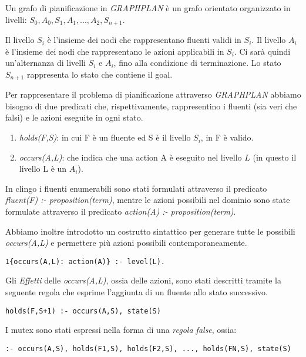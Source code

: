 Un grafo di pianificazione in \emph{GRAPHPLAN} è un grafo orientato organizzato in livelli: $S_0, A_0, S_1, A_1, ... , A_2, S_{n+1}$.

Il livello $S_i$ è l'insieme dei nodi che rappresentano fluenti validi in $S_i$. Il livello $A_i$ è l'insieme dei nodi che rappresentano le azioni applicabili in $S_i$. Ci sarà quindi un'alternanza di livelli $S_i$ e $A_i$, fino alla condizione di terminazione. Lo stato $S_{n+1}$ rappresenta lo stato che contiene il goal.

Per rappresentare il problema di pianificazione attraverso \emph{GRAPHPLAN} abbiamo bisogno di due predicati che, rispettivamente, rappresentino i fluenti (sia veri che falsi) e le azioni eseguite in ogni stato.

\begin{enumerate}
\item \emph{holds(F,S)}: in cui F è un fluente ed S è il livello $S_i$, in F è valido.
\item \emph{occurs(A,L)}: che indica che una action A è eseguito nel livello $L$ (in questo il livello L è un $A_i$).
\end{enumerate}

In clingo i fluenti enumerabili sono stati formulati attraverso il predicato \emph{fluent(F) :- proposition(term)}, mentre le azioni possibili nel dominio sono state formulate attraverso il predicato \emph{action(A) :- proposition(term)}.

Abbiamo inoltre introdotto un costrutto sintattico per generare tutte le possibili \emph{occurs(A,L)} e permettere più azioni possibili contemporaneamente.

\begin{lstlisting}
1{occurs(A,L): action(A)} :- level(L).
\end{lstlisting}

Gli \emph{Effetti} delle \emph{occurs(A,L)}, ossia delle azioni, sono stati descritti tramite la seguente regola che esprime l'aggiunta di un fluente allo stato successivo.

\begin{lstlisting}
holds(F,S+1) :- occurs(A,S), state(S)
\end{lstlisting}

I mutex sono stati espressi nella forma di una \emph{regola false}, ossia:

\begin{lstlisting}
:- occurs(A,S), holds(F1,S), holds(F2,S), ..., holds(FN,S), state(S)
\end{lstlisting}


